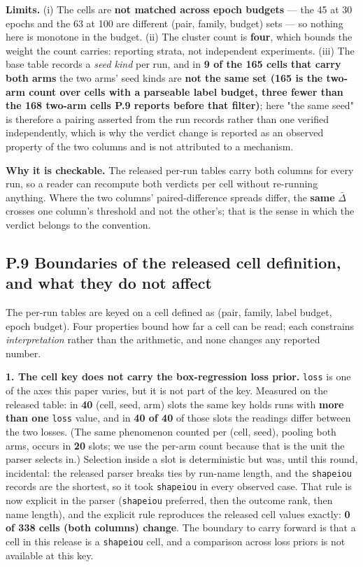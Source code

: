 \documentclass[pdflatex,sn-mathphys-ay]{sn-jnl}
\begin{document}
\textbf{Limits.} (i) The cells are \textbf{not matched across epoch budgets} --- the 45 at 30 epochs and the 63 at 100 are different (pair, family, budget) sets --- so nothing here is monotone in the budget. (ii) The cluster count is \textbf{four}, which bounds the weight the count carries: reporting strata, not independent experiments. (iii) The base table records a \emph{seed kind} per run, and in \textbf{9 of the 165 cells that carry both arms} the two arms' seed kinds are \textbf{not the same set (165 is the two-arm count over cells with a parseable label budget, three fewer than the 168 two-arm cells P.9 reports before that filter)}; here "the same seed" is therefore a pairing asserted from the run records rather than one verified independently, which is why the verdict change is reported as an observed property of the two columns and is not attributed to a mechanism.

\textbf{Why it is checkable.} The released per-run tables carry both columns for every run, so a reader can recompute both verdicts per cell without re-running anything. Where the two columns' paired-difference spreads differ, the \textbf{same} $\bar\Delta$ crosses one column's threshold and not the other's; that is the sense in which the verdict belongs to the convention.

\subsection*{P.9 Boundaries of the released cell definition, and what they do not affect}

The per-run tables are keyed on a cell defined as (pair, family, label budget, epoch budget). Four properties bound how far a cell can be read; each constrains \emph{interpretation} rather than the arithmetic, and none changes any reported number.

\textbf{1. The cell key does not carry the box-regression loss prior.} \texttt{loss} is one of the axes this paper varies, but it is not part of the key. Measured on the released table: in \textbf{40} (cell, seed, arm) slots the same key holds runs with \textbf{more than one} \texttt{loss} value, and in \textbf{40 of 40} of those slots the readings differ between the two losses. (The same phenomenon counted per (cell, seed), pooling both arms, occurs in \textbf{20} slots; we use the per-arm count because that is the unit the parser selects in.) Selection inside a slot is deterministic but was, until this round, incidental: the released parser breaks ties by run-name length, and the \texttt{shapeiou} records are the shortest, so it took \texttt{shapeiou} in every observed case. That rule is now explicit in the parser (\texttt{shapeiou} preferred, then the outcome rank, then name length), and the explicit rule reproduces the released cell values exactly: \textbf{0 of 338 cells (both columns) change}. The boundary to carry forward is that a cell in this release is a \texttt{shapeiou} cell, and a comparison across loss priors is not available at this key.
\end{document}
